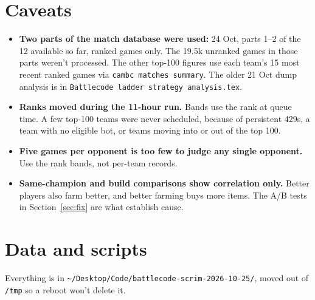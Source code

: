 \documentclass[11pt,a4paper]{article}
\begin{document}
\section{Caveats}

\begin{itemize}
  \item \textbf{Two parts of the match database were used:} 24 Oct, parts 1--2 of the 12 available so far, ranked games only. The 19.5k unranked games in those parts weren't processed. The other top-100 figures use each team's 15 most recent ranked games via \texttt{cambc matches summary}. The older 21 Oct dump analysis is in \texttt{Battlecode ladder strategy analysis.tex}.
  \item \textbf{Ranks moved during the 11-hour run.} Bands use the rank at queue time. A few top-100 teams were never scheduled, because of persistent 429s, a team with no eligible bot, or teams moving into or out of the top 100.
  \item \textbf{Five games per opponent is too few to judge any single opponent.} Use the rank bands, not per-team records.
  \item \textbf{Same-champion and build comparisons show correlation only.} Better players also farm better, and better farming buys more items. The A/B tests in Section~\ref{sec:fix} are what establish cause.
\end{itemize}

\section*{Data and scripts}

Everything is in \texttt{\textasciitilde/Desktop/Code/battlecode-scrim-2026-10-25/}, moved out of \texttt{/tmp} so a reboot won't delete it.
\end{document}
